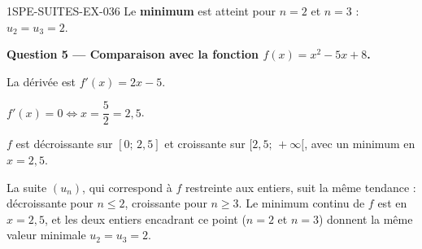 \begin{corrige}{1SPE-SUITES-EX-036}
Le \textbf{minimum} est atteint pour $n = 2$ et $n = 3$ : $u_2 = u_3 = 2$.

\medskip
\textbf{Question 5 — Comparaison avec la fonction $f(x) = x^2 - 5x + 8$.}

La dérivée est $f'(x) = 2x - 5$.

$f'(x) = 0 \iff x = \dfrac{5}{2} = 2{,}5$.


$f$ est décroissante sur $[0;\, 2{,}5]$ et croissante sur $[2{,}5;\, +\infty[$, avec un minimum en $x = 2{,}5$.

La suite $(u_n)$, qui correspond à $f$ restreinte aux entiers, suit la même tendance : décroissante pour $n \leq 2$, croissante pour $n \geq 3$. Le minimum continu de $f$ est en $x = 2{,}5$, et les deux entiers encadrant ce point ($n = 2$ et $n = 3$) donnent la même valeur minimale $u_2 = u_3 = 2$.

\end{corrige}

